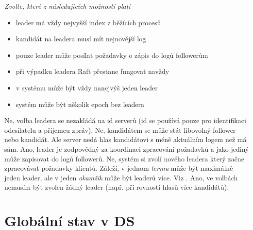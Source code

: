 \documentclass[usenames,dvipsnames,9pt]{beamer}
\begin{document}
{\begin{frame}[fragile]
\vspace{1em}

{\em Zvolte, které z následujících možností platí}

\begin{itemize}
\item leader má vždy nejvyšší index z běžících procesů 
\item kandidát na leadera musí mít nejnovější log  
\item pouze leader může posílat požadavky o zápis do logů followerům 
\item při výpadku leadera Raft přestane fungovat navždy 
\item v systému může být vždy nanejvýš jeden leader 
\item systém může být několik epoch bez leadera 
\end{itemize}
\vspace{1em}
\begin{overprint}[\textwidth]
   Ne, volba leadera se nezakládá na id serverů (id se používá pouze pro identifikaci odesílatelu a příjemcu zpráv).
   Ne, kandidátem se může stát libovolný follower nebo kandidát. Ale server nedá hlas kandidátovi s méně aktuálním logem než má sám. 
   Ano, leader je zodpovědný za koordinaci zpracování požadavků a jako jediný může zapisovat do logů followerů. 
   Ne, systém si zvolí nového leadera který začne zpracovávat požadavky klientů. 
   Záleží, v jednom \emph{termu} může být maximálně jeden leader, ale v jeden \emph{okamžik} může být leaderů více. Viz \href{http://thesecretlivesofdata.com/raft/}{}.
   Ano, ve volbách nemusím být zvolen žádný leader (např. při rovnosti hlasů více kandidátů).
\end{overprint}
\end{frame}
}

\section{Globální stav v DS}
\end{document}

